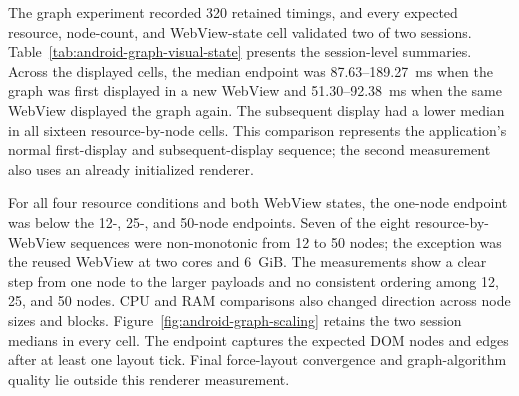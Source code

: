 The graph experiment recorded 320 retained timings, and every expected
resource, node-count, and WebView-state cell validated two of two sessions.
Table~\ref{tab:android-graph-visual-state} presents the session-level
summaries. Across the displayed cells, the median endpoint was
87.63--189.27~ms when the graph was first displayed in a new WebView and
51.30--92.38~ms when the same WebView displayed the graph again. The
subsequent display had a lower median in all sixteen resource-by-node cells.
This comparison represents the application's normal first-display and
subsequent-display sequence; the second measurement also uses an already
initialized renderer.

\begin{table}[htbp]
\centering
\small
\setlength{\tabcolsep}{4.8pt}
\renewcommand{\arraystretch}{1.12}
\caption{Median citation-graph visual-state latency by emulator resource
condition, WebView state, and node count, in milliseconds.}
\label{tab:android-graph-visual-state}
\normalsize
\end{table}

For all four resource conditions and both WebView states, the one-node
endpoint was below the 12-, 25-, and 50-node endpoints. Seven of the eight
resource-by-WebView sequences were non-monotonic from 12 to 50 nodes; the
exception was the reused WebView at two cores and 6~GiB. The measurements show
a clear step from one node to the larger payloads and no consistent ordering
among 12, 25, and 50 nodes. CPU and RAM comparisons also changed direction
across node sizes and blocks.
Figure~\ref{fig:android-graph-scaling} retains the two session medians in every
cell. The endpoint captures the expected DOM nodes and edges after at least one
layout tick. Final force-layout convergence and graph-algorithm quality lie
outside this renderer measurement.

